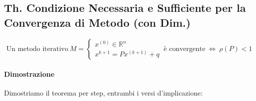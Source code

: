 \documentclass{article}
\begin{document}
\subsection{Th. Condizione Necessaria e Sufficiente per la Convergenza di Metodo (con Dim.)}

\vspace*{12px}

\[ \text{Un metodo iterativo} \: M = \left\{ \begin{array}{rcl}
    x^{(0)} \in \mathbb{R}^{n} \\ 
    x^{k+1} = Px^{(k+1)} + q 
    \end{array}\right.
    \: \text{è convergente} \:
    \Longleftrightarrow
    \:
    \rho(P) < 1
\]

\paragraph{Dimostrazione} Dimostriamo il teorema per step, entrambi i versi d'implicazione:
\end{document}
